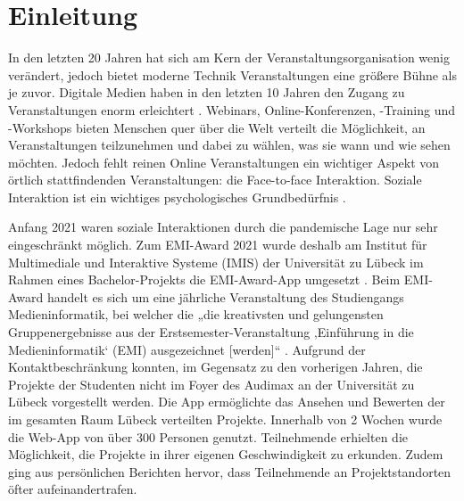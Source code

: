 \chapter{Einleitung}


In den letzten 20 Jahren hat sich am Kern der Veranstaltungsorganisation wenig
verändert, jedoch bietet moderne Technik Veranstaltungen eine größere Bühne als
je zuvor. Digitale Medien haben in den letzten 10 Jahren den Zugang zu
Veranstaltungen enorm erleichtert \cite{Bladen2017}. Webinars,
Online-Konferenzen, -Training und -Workshops bieten Menschen quer über die Welt
verteilt die Möglichkeit, an Veranstaltungen teilzunehmen und dabei zu wählen,
was sie wann und wie sehen möchten. Jedoch fehlt reinen Online Veranstaltungen
ein wichtiger Aspekt von örtlich stattfindenden Veranstaltungen: die
Face-to-face Interaktion. Soziale Interaktion ist ein wichtiges
psychologisches Grundbedürfnis \cite{Maslow1943}.

Anfang 2021 waren soziale Interaktionen durch die pandemische Lage nur sehr
eingeschränkt möglich. Zum EMI-Award 2021 wurde deshalb am Institut für
Multimediale und Interaktive Systeme (IMIS) der Universität zu Lübeck im Rahmen
eines Bachelor-Projekts die EMI-Award-App umgesetzt \cite{Canzler2021}. Beim
EMI-Award handelt es sich um eine jährliche Veranstaltung des Studiengangs
Medieninformatik, bei welcher die „die kreativsten und gelungensten
Gruppenergebnisse aus der Erstsemester-Veranstaltung ‚Einführung in die
Medieninformatik‘ (EMI) ausgezeichnet [werden]“ \cite{UniversitatzuLubeck2021}.
Aufgrund der Kontaktbeschränkung konnten, im Gegensatz zu den vorherigen Jahren,
die Projekte der Studenten nicht im Foyer des Audimax an der Universität zu
Lübeck vorgestellt werden. Die App ermöglichte das Ansehen und Bewerten der im
gesamten Raum Lübeck verteilten Projekte. Innerhalb von 2 Wochen wurde die
Web-App von über 300 Personen genutzt. Teilnehmende erhielten die Möglichkeit,
die Projekte in ihrer eigenen Geschwindigkeit zu erkunden. Zudem ging aus
persönlichen Berichten hervor, dass Teilnehmende an Projektstandorten öfter
aufeinandertrafen.


